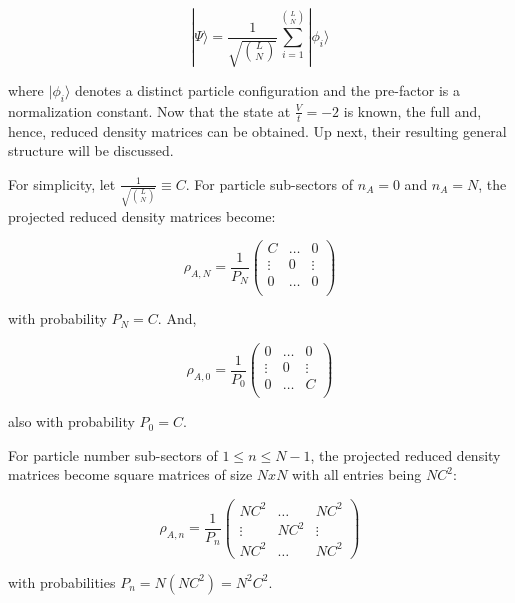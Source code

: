 \begin{equation} 
|\Psi \rangle = \frac{1}{\sqrt{{L}\choose{N}}} \sum_{i=1}^{{L}\choose{N}} | \phi_{i} \rangle
\end{equation}

where $|\phi_{i}\rangle$ denotes a distinct particle configuration and the pre-factor is a normalization constant. Now that the state at $\frac{V}{t}=-2$ is known, the full and, hence, reduced density matrices can be obtained. Up next, their resulting general structure will be discussed.

For simplicity, let $\frac{1}{\sqrt{{L}\choose{N}}} \equiv C$. For particle sub-sectors of $n_A = 0$ and $n_A = N$, the projected reduced density matrices become:

\begin{equation}
\rho_{A,N} = \frac{1}{P_{N}} \begin{pmatrix}
C & \dots & 0 \\ 
\vdots & 0 & \vdots \\
0 & \dots & 0 \\
\end{pmatrix}
\end{equation}

with probability $P_{N} = C$. And, 

\begin{equation}
\rho_{A,0} = \frac{1}{P_{0}} \begin{pmatrix}
0 & \dots & 0 \\ 
\vdots & 0 & \vdots \\
0 & \dots & C \\
\end{pmatrix}
\end{equation}

also with probability $P_{0} = C$.

For particle number sub-sectors of $1 \leq n \leq N-1$, the projected reduced density matrices become square matrices of size $NxN$ with all entries being $NC^2$:

\begin{equation}
\rho_{A,n} = \frac{1}{P_{n}} \begin{pmatrix}
NC^2 & \dots & NC^2 \\ 
\vdots & NC^2 & \vdots \\
NC^2 & \dots & NC^2
\end{pmatrix}
\end{equation}

with probabilities $P_{n}=N(NC^2)=N^2C^2$.

